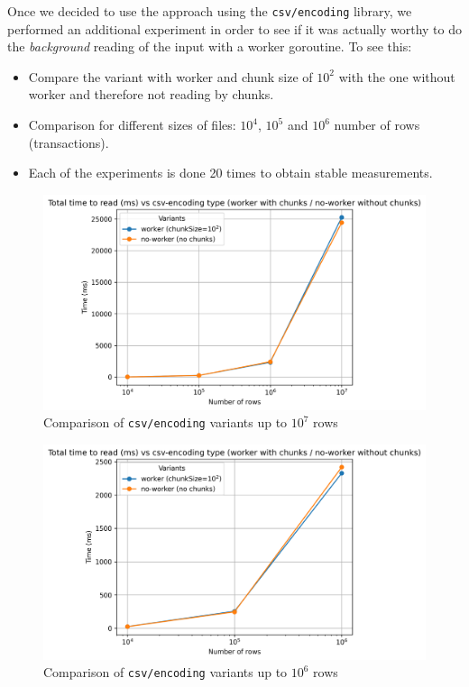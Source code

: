 \documentclass[12pt,a4paper]{article}
\begin{document}
Once we decided to use the approach using the \texttt{csv/encoding} library, we performed an additional experiment in order to see if it was actually worthy to do the \emph{background} reading of the input with a worker goroutine. To see this:

\begin{itemize}
  \item Compare the variant with worker and chunk size of $10^2$ with the one without worker and therefore not reading by chunks.
  \item Comparison for different sizes of files: $10^4$, $10^5$ and $10^6$ number of rows (transactions).
  \item Each of the experiments is done 20 times to obtain stable measurements.
\end{itemize}

\begin{figure}[H]
  \centering
  \includegraphics[scale = 0.7]{images/4-Experiments/read-input-csv-encoding-all.png}
  \caption{Comparison of \texttt{csv/encoding} variants up to $10^7$ rows}
\end{figure}

\begin{figure}[H]
  \centering
  \includegraphics[scale = 0.7]{images/4-Experiments/read-input-csv-encoding.png}
  \caption{Comparison of \texttt{csv/encoding} variants up to $10^6$ rows}
\end{figure}
\end{document}
